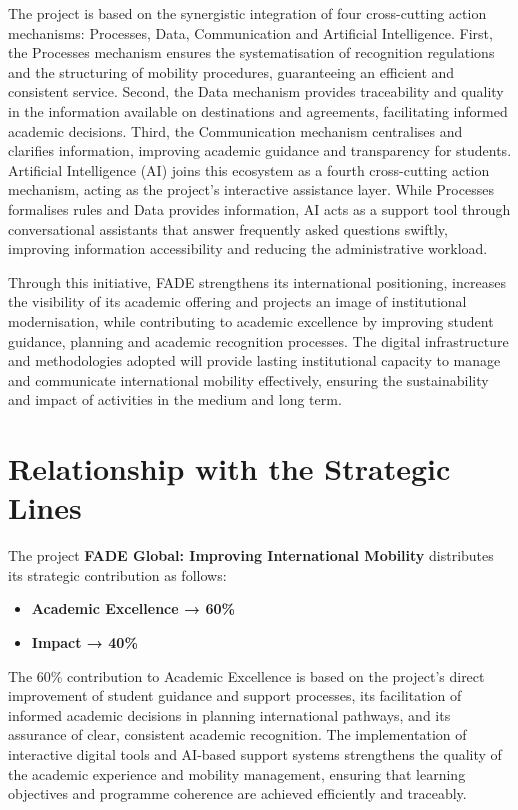 \documentclass[11pt,a4paper]{scrreprt}
\begin{document}
The project is based on the synergistic integration of four cross-cutting action mechanisms: Processes, Data, Communication and Artificial Intelligence. First, the Processes mechanism ensures the systematisation of recognition regulations and the structuring of mobility procedures, guaranteeing an efficient and consistent service. Second, the Data mechanism provides traceability and quality in the information available on destinations and agreements, facilitating informed academic decisions. Third, the Communication mechanism centralises and clarifies information, improving academic guidance and transparency for students. Artificial Intelligence (AI) joins this ecosystem as a fourth cross-cutting action mechanism, acting as the project's interactive assistance layer. While Processes formalises rules and Data provides information, AI acts as a support tool through conversational assistants that answer frequently asked questions swiftly, improving information accessibility and reducing the administrative workload.

Through this initiative, FADE strengthens its international positioning, increases the visibility of its academic offering and projects an image of institutional modernisation, while contributing to academic excellence by improving student guidance, planning and academic recognition processes. The digital infrastructure and methodologies adopted will provide lasting institutional capacity to manage and communicate international mobility effectively, ensuring the sustainability and impact of activities in the medium and long term.

\section{Relationship with the Strategic Lines}

\small
The project \textbf{FADE Global: Improving International Mobility} distributes its strategic contribution as follows:

\begin{itemize}[noitemsep,topsep=2pt]
\item \textbf{Academic Excellence → 60\%}
\item \textbf{Impact → 40\%}
\end{itemize}

The 60\% contribution to Academic Excellence is based on the project's direct improvement of student guidance and support processes, its facilitation of informed academic decisions in planning international pathways, and its assurance of clear, consistent academic recognition. The implementation of interactive digital tools and AI-based support systems strengthens the quality of the academic experience and mobility management, ensuring that learning objectives and programme coherence are achieved efficiently and traceably.
\end{document}
